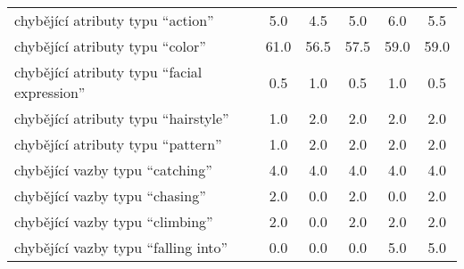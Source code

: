 \begin{table}[ht!]
\begin{tabular}{|l|c|c|c|c|c|}
		\hline
		chybějící atributy typu \enquote{action}            & 5.0                                         & 4.5        & 5.0        & 6.0        & 5.5        \\
		chybějící atributy typu \enquote{color}             & 61.0                                        & 56.5       & 57.5       & 59.0       & 59.0       \\
		chybějící atributy typu \enquote{facial expression} & 0.5                                         & 1.0        & 0.5        & 1.0        & 0.5        \\
		chybějící atributy typu \enquote{hairstyle}         & 1.0                                         & 2.0        & 2.0        & 2.0        & 2.0        \\
		chybějící atributy typu \enquote{pattern}           & 1.0                                         & 2.0        & 2.0        & 2.0        & 2.0        \\
		\hline
		chybějící vazby typu \enquote{catching}             & 4.0                                         & 4.0        & 4.0        & 4.0        & 4.0        \\
		chybějící vazby typu \enquote{chasing}              & 2.0                                         & 0.0        & 2.0        & 0.0        & 2.0        \\
		chybějící vazby typu \enquote{climbing}             & 2.0                                         & 0.0        & 2.0        & 2.0        & 2.0        \\
		chybějící vazby typu \enquote{falling into}         & 0.0                                         & 0.0        & 0.0        & 5.0        & 5.0        \\

\end{tabular}
\end{table}
